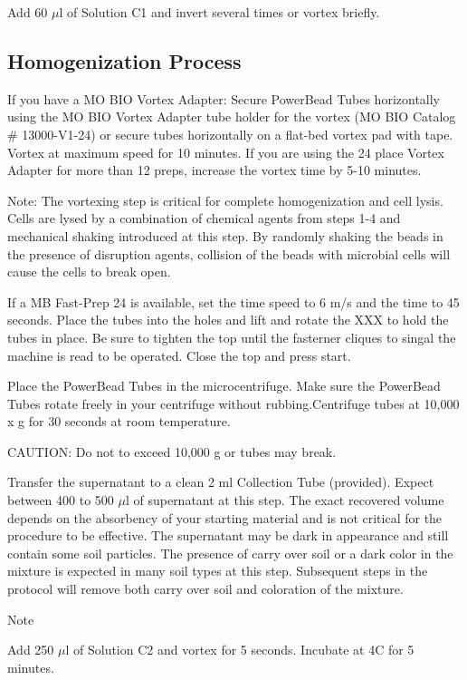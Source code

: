 \documentclass[12pt]{../SOP4_alpha}\usepackage[]{graphicx}\usepackage[]{xcolor}
\begin{document}
\NP Add 60 $\mu$l of Solution C1 and invert several times or vortex briefly.

\subsection*{Homogenization Process} 

\NP If you have a MO BIO Vortex Adapter: Secure PowerBead Tubes horizontally using the MO BIO Vortex Adapter tube holder for the vortex (MO BIO Catalog \# 13000-V1-24) or secure tubes
horizontally on a flat-bed vortex pad with tape. Vortex at maximum speed for 10 minutes. If you are using the 24 place Vortex Adapter for more than 12 preps, increase the vortex time by 5-10 minutes. 

\noindent Note: The vortexing step is critical for complete homogenization and cell lysis. Cells are lysed by a combination of chemical agents from steps 1-4 and mechanical shaking introduced at this step. By randomly shaking the beads in the presence of disruption agents, collision of the beads with microbial cells will cause the cells to break open.

\NP If a MB Fast-Prep 24 is available, set the time speed to 6 m/s and the time to 45 seconds. Place the tubes into the holes and lift and rotate the XXX to hold the tubes in place. Be sure to tighten the top until the fasterner cliques to singal the machine is read to be operated. Close the top and press start.


\NP Place the PowerBead Tubes in the microcentrifuge. Make sure the PowerBead Tubes rotate freely in your centrifuge without rubbing.Centrifuge tubes at 10,000 x g for 30 seconds at room temperature. 

\noindent CAUTION: Do not to exceed 10,000 g or tubes may break.

\NP Transfer the supernatant to a clean 2 ml Collection Tube (provided). Expect between 400 to 500 $\mu$l of supernatant at this step. The exact recovered volume depends on the absorbency of
your starting material and is not critical for the procedure to be effective. The supernatant may be dark in appearance and still contain some soil particles. The presence of carry over soil or a dark color in the mixture is expected in many
soil types at this step. Subsequent steps in the protocol will remove both carry over soil and coloration of the mixture.

Note

\NP Add 250 $\mu$l of Solution C2 and vortex for 5 seconds. Incubate at 4\degree C for 5
minutes.
\end{document}
